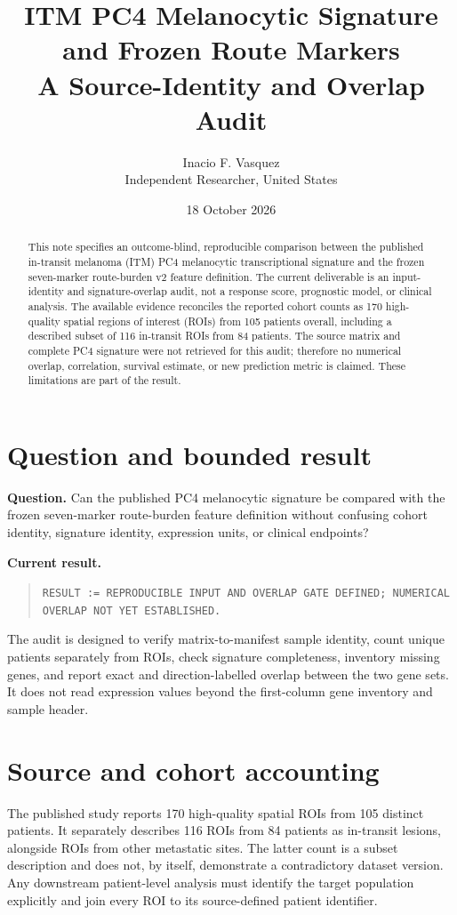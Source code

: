 \documentclass[11pt]{article}
\title{ITM PC4 Melanocytic Signature and Frozen Route Markers\\
\large A Source-Identity and Overlap Audit}
\author{Inacio F. Vasquez\\Independent Researcher, United States}
\date{18 October 2026}
\begin{document}
\maketitle

\begin{abstract}
This note specifies an outcome-blind, reproducible comparison between the published in-transit melanoma (ITM) PC4 melanocytic transcriptional signature and the frozen seven-marker route-burden v2 feature definition. The current deliverable is an input-identity and signature-overlap audit, not a response score, prognostic model, or clinical analysis. The available evidence reconciles the reported cohort counts as 170 high-quality spatial regions of interest (ROIs) from 105 patients overall, including a described subset of 116 in-transit ROIs from 84 patients. The source matrix and complete PC4 signature were not retrieved for this audit; therefore no numerical overlap, correlation, survival estimate, or new prediction metric is claimed. These limitations are part of the result.
\end{abstract}

\section{Question and bounded result}

\textbf{Question.} Can the published PC4 melanocytic signature be compared with the frozen seven-marker route-burden feature definition without confusing cohort identity, signature identity, expression units, or clinical endpoints?

\textbf{Current result.}
\begin{quote}
\texttt{RESULT := REPRODUCIBLE INPUT AND OVERLAP GATE DEFINED; NUMERICAL OVERLAP NOT YET ESTABLISHED.}
\end{quote}

The audit is designed to verify matrix-to-manifest sample identity, count unique patients separately from ROIs, check signature completeness, inventory missing genes, and report exact and direction-labelled overlap between the two gene sets. It does not read expression values beyond the first-column gene inventory and sample header.

\section{Source and cohort accounting}

The published study reports 170 high-quality spatial ROIs from 105 distinct patients. It separately describes 116 ROIs from 84 patients as in-transit lesions, alongside ROIs from other metastatic sites. The latter count is a subset description and does not, by itself, demonstrate a contradictory dataset version. Any downstream patient-level analysis must identify the target population explicitly and join every ROI to its source-defined patient identifier.
\end{document}

